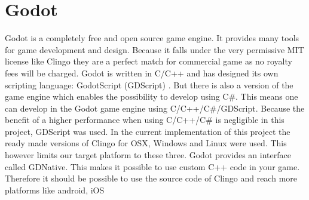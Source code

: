 \documentclass[runningheads]{llncs}
\begin{document}
    \section{Godot}
        Godot is a completely free and open source game engine.
        It provides many tools for game development and design.
        Because it falls under the very permissive MIT license like Clingo 
        they are a perfect match for commercial game as no royalty fees will be charged.
        Godot is written in C/C++ and has designed its own scripting language: GodotScript (GDScript) \cite{godotWebsite}.
        But there is also a version of the game engine which enables the possibility to develop using C\#.
        This means one can develop in the Godot game engine using C/C++/C\#/GDScript.
        Because the benefit of a higher performance when using C/C++/C\# \cite{godotPerformanceComparison} is negligible in this project,
        GDScript was used.\newline
        In the current implementation of this project the ready made versions of Clingo for OSX, Windows and Linux \cite{clingoGithub} were used.
        This however limits our target platform to these three.
        Godot provides an interface called GDNative.
        This makes it possible to use custom C++ code in your game.
        Therefore it should be possible to use the source code of Clingo \cite{clingoGithub} and reach more platforms like android, iOS  
        
\end{document}
